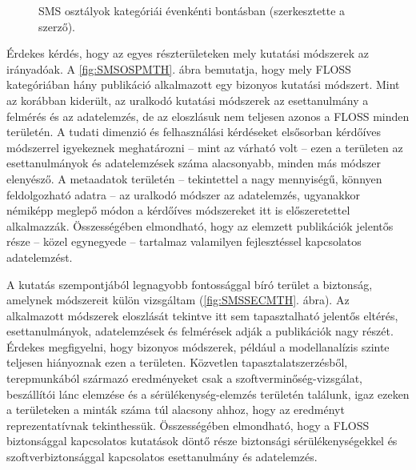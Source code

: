 \documentclass[12pt,magyar,a4paper,oneside]{scrreprt}
\begin{document}
\begin{figure}
\centering


\caption{SMS osztályok kategóriái évenkénti bontásban (szerkesztette a
szerző).}

\label{fig:SMSByYear}

\end{figure}

Érdekes kérdés, hogy az egyes részterületeken mely kutatási módszerek az
irányadóak. A \ref{fig:SMSOSPMTH}. ábra bemutatja, hogy mely FLOSS
kategóriában hány publikáció alkalmazott egy bizonyos kutatási módszert.
Mint az korábban kiderült, az uralkodó kutatási módszerek az
esettanulmány a felmérés és az adatelemzés, de az eloszlásuk nem
teljesen azonos a FLOSS minden területén. A tudati dimenzió és
felhasználási kérdéseket elsősorban kérdőíves módszerrel igyekeznek
meghatározni -- mint az várható volt -- ezen a területen az
esettanulmányok és adatelemzések száma alacsonyabb, minden más módszer
elenyésző. A metaadatok területén -- tekintettel a nagy mennyiségű,
könnyen feldolgozható adatra -- az uralkodó módszer az adatelemzés,
ugyanakkor némiképp meglepő módon a kérdőíves módszereket itt is
előszeretettel alkalmazzák. Összességében elmondható, hogy az elemzett
publikációk jelentős része -- közel egynegyede -- tartalmaz valamilyen
fejlesztéssel kapcsolatos adatelemzést.

A kutatás szempontjából legnagyobb fontossággal bíró terület a
biztonság, amelynek módszereit külön vizsgáltam (\ref{fig:SMSSECMTH}.
ábra). Az alkalmazott módszerek eloszlását tekintve itt sem
tapasztalható jelentős eltérés, esettanulmányok, adatelemzések és
felmérések adják a publikációk nagy részét. Érdekes megfigyelni, hogy
bizonyos módszerek, például a modellanalízis szinte teljesen hiányoznak
ezen a területen. Közvetlen tapasztalatszerzésből, terepmunkából
származó eredményeket csak a szoftverminőség-vizsgálat, beszállítói lánc
elemzése és a sérülékenység-elemzés területén találunk, igaz ezeken a
területeken a minták száma túl alacsony ahhoz, hogy az eredményt
reprezentatívnak tekinthessük. Összességében elmondható, hogy a FLOSS
biztonsággal kapcsolatos kutatások döntő része biztonsági
sérülékenységekkel és szoftverbiztonsággal kapcsolatos esettanulmány és
adatelemzés.
\end{document}
